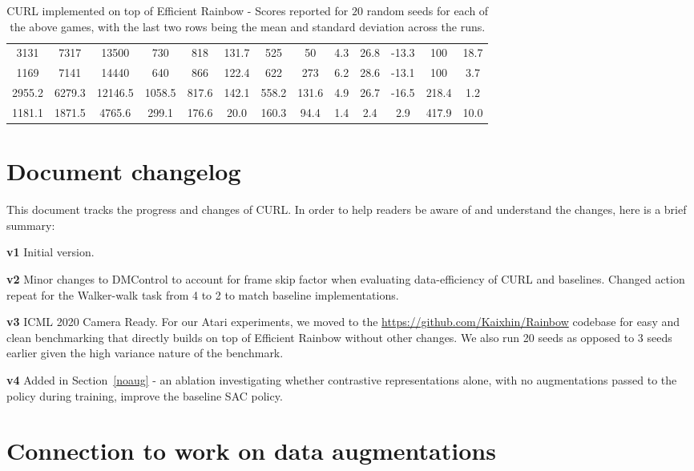 \documentclass{article}
\begin{document}
\begin{table*}[!ht]
\begin{tabular}{c|c|c|c|c|c|c|c|c|c|c|c|c}
3131 &	7317 &	13500 &	730 &	818 &	131.7 &	525 &	50	 & 4.3	 & 26.8 &	-13.3 &	100 &	18.7 \\
1169 &	7141 &	14440 &	640 &	866 &	122.4 &	622 &	273 &	6.2 &	28.6 &	-13.1 &	100 &	3.7 \\
\hline
2955.2 & 6279.3 &	12146.5 &	1058.5 &	817.6 &	142.1 &	558.2 &	131.6 &	4.9 &	26.7 &	-16.5 &	218.4 & 1.2 \\
\hline
1181.1 & 1871.5 &	4765.6 &	299.1 &	176.6 &	20.0 &	160.3 &	94.4 &	1.4 &	2.4 & 2.9 & 417.9 &  10.0 \\
\hline
\end{tabular}
\vspace*{-0mm}
\caption{CURL implemented on top of Efficient Rainbow - Scores reported for $20$ random seeds for each of the above games, with the last two rows being the mean and standard deviation across the runs.}
\label{tab:atari2}
\vspace{-2mm}
\end{table*} \section{Document changelog}

This document tracks the progress and changes of CURL. In order to help readers be aware of and understand the changes, here is a brief summary:

{\bf v1} Initial version.

{\bf v2} Minor changes to DMControl to account for frame skip factor when evaluating data-efficiency of CURL and baselines. Changed action repeat for the Walker-walk task from 4 to 2 to match baseline implementations.       

{\bf v3} ICML 2020 Camera Ready. For our Atari experiments, we moved to the \url{https://github.com/Kaixhin/Rainbow} codebase for easy and clean benchmarking that directly builds on top of Efficient Rainbow without other changes. We also run 20 seeds as opposed to 3 seeds earlier given the high variance nature of the benchmark.  

{\bf v4} Added in Section~\ref{noaug} - an ablation investigating whether contrastive representations alone, with no augmentations passed to the policy during training, improve the baseline SAC policy. \section{Connection to work on data augmentations}
\end{document}

